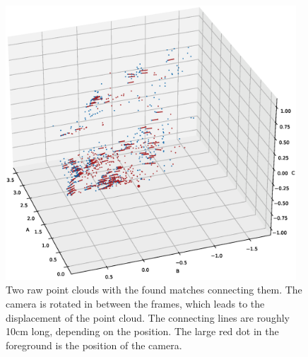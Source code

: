 \begin{figure}[H]
  \centering
  \includegraphics[width=0.97\textwidth,trim={7cm 7cm 8cm 5cm},clip]{images/3d_features_rotation.eps}
  \caption{Two raw point clouds with the found matches connecting them. The camera is rotated in between the frames, which leads to the displacement of the point cloud. The connecting lines are roughly 10cm long, depending on the position. The large red dot in the foreground is the position of the camera.}
  \label{im:3d_features_rotation}
\end{figure}

